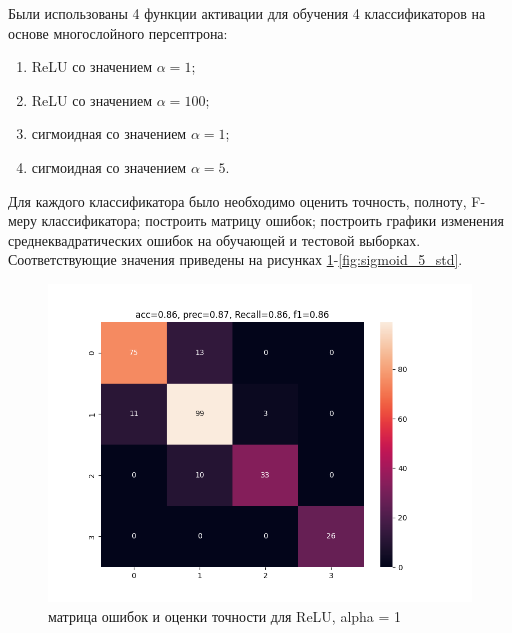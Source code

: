 \documentclass[12pt]{report}
\begin{document}
Были использованы 4 функции активации для обучения 4 классификаторов на основе многослойного персептрона:
\begin{enumerate}
    \item ReLU со значением $\alpha = 1$;
    \item ReLU со значением $\alpha = 100$;
    \item сигмоидная со значением $\alpha = 1$;
    \item сигмоидная со значением $\alpha = 5$.
\end{enumerate}

Для каждого классификатора было необходимо оценить точность, полноту, F-меру классификатора; построить матрицу ошибок; построить графики изменения среднеквадратических ошибок на обучающей и тестовой  выборках. Соответствующие значения приведены на рисунках \ref{fig:relu_1_matrix}-\ref{fig:sigmoid_5_std}.
\newpage
\begin{figure}[h!]
  \centering
  \includegraphics[width = \linewidth / 2]{matrix_errors_relu_1.png}
  \caption{матрица ошибок и оценки точности для ReLU, alpha = 1}
  \label{fig:relu_1_matrix}
\end{figure}
\end{document}
